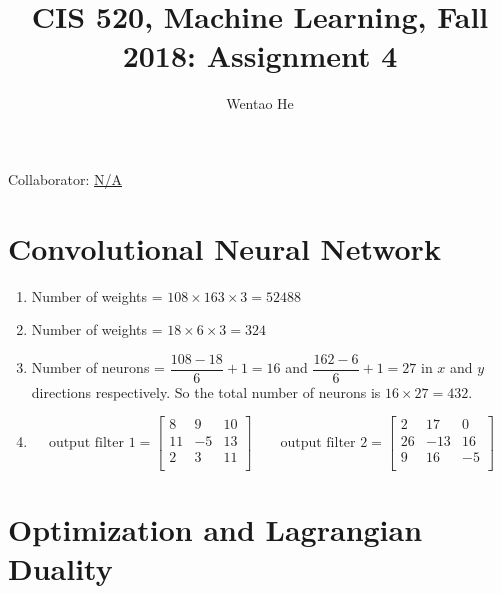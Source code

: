 \documentclass[english]{article}
\title{CIS 520, Machine Learning, Fall 2018: Assignment 4\\}
\date{}
\author{Wentao He}
\begin{document}
\maketitle
{\normalsize Collaborator: \underline{N/A}}


\section{Convolutional Neural Network}
\begin{enumerate}
    \item Number of weights = $108 \times 163 \times 3 = \boxed{52488}$
    
    \item Number of weights = $18 \times 6 \times 3 = \boxed{324}$
    
    \item Number of neurons = $\dfrac{108-18}{6}+1 = \boxed{16}$ and $\dfrac{162-6}{6}+1 = \boxed{27}$ in $x$ and $y$ directions respectively. So the total number of neurons is $16 \times 27 = \boxed{432}$.
    
    \item \begin{equation*}
  \text{output filter 1} = \boxed{
    \begin{bmatrix}
    8&9&10\\
    11&-5&13\\
    2&3&11\\
    \end{bmatrix}} \quad\quad
  \text{output filter 2} = \boxed{
    \begin{bmatrix}
    2&17&0\\
    26&-13&16\\
    9&16&-5\\
    \end{bmatrix}}
\end{equation*}
\end{enumerate}
\clearpage


\section{Optimization and Lagrangian Duality}
\label{sec:optimization}
\end{document}
